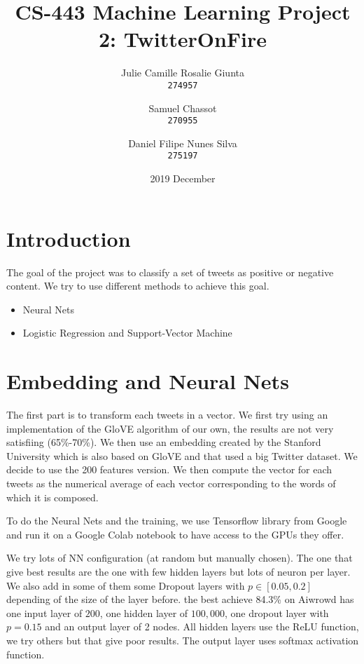 \documentclass[11pt, a4paper, twocolumn]{article}
\begin{document}
\date{2019 December}
\title{CS-443 Machine Learning Project 2: TwitterOnFire}
\author{
  Julie Camille Rosalie Giunta\\
  \texttt{274957}
  \and
  Samuel Chassot\\
  \texttt{270955}
  \and
  Daniel Filipe Nunes Silva\\
  \texttt{275197}
}

\maketitle
\clearpage

\section{Introduction}
The goal of the project was to classify a set of tweets as positive or negative content. We try to use different methods to achieve this goal.

\begin{itemize}
  \item Neural Nets
	\item Logistic Regression and Support-Vector Machine
\end{itemize}

\section{Embedding and Neural Nets}
The first part is to transform each tweets in a vector. We first try using an implementation of the GloVE algorithm of our own, the results are not very satisfiing (65\%-70\%). We then use an embedding created by the Stanford University which is also based on GloVE and that used a big Twitter dataset. We decide to use the 200 features version.
We then compute the vector for each tweets as the numerical average of each vector corresponding to the words of which it is composed.

To do the Neural Nets and the training, we use Tensorflow library from Google and run it on a Google Colab notebook to have access to the GPUs they offer.

We try lots of NN configuration (at random but manually chosen). The one that give best results are the one with few hidden layers but lots of neuron per layer. We also add in some of them some Dropout layers with $p\in [0.05, 0.2]$ depending of the size of the layer before.
the best achieve 84.3\% on Aiwrowd has one input layer of $200$, one hidden layer of $100,000$, one dropout layer with $p=0.15$ and an output layer of 2 nodes. All hidden layers use the ReLU function, we try others but that give poor results. The output layer uses softmax activation function.
\end{document}
